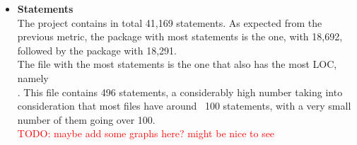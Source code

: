 \begin{itemize}
\begin{itemize}
                        \item[-] The second biggest package is 
                         with 41,450 LOCs; out of the 22 examples, the Conference Scheduling
                        \footnote{\url{https://docs.optaplanner.org/7.32.0.Final/optaplanner-docs/html\_single/index.html\#conferenceScheduling}}
                        and Nurse Rostering
                        \footnote{\url{https://docs.optaplanner.org/7.32.0.Final/optaplanner-docs/html\_single/index.html\#nurseRostering}}
                        stood out as the biggest, with 4,262 and 3,460 LOC respectively.
                    \end{itemize}
                \item \textbf{Statements}\\
                    The project contains in total 41,169 statements. As expected from the previous metric, the package with most statements is the  one, with 18,692, followed by the  package with 18,291. \\ 
                    The file with the most statements is the one that also has the most LOC, namely \\
                    . This file contains 496 statements, a considerably high number taking into consideration that most files have around ~100 statements, with a very small number of them going over 100.
                    \\ \textcolor{red}{TODO: maybe add some graphs here? might be nice to see}
                    

\end{itemize}
